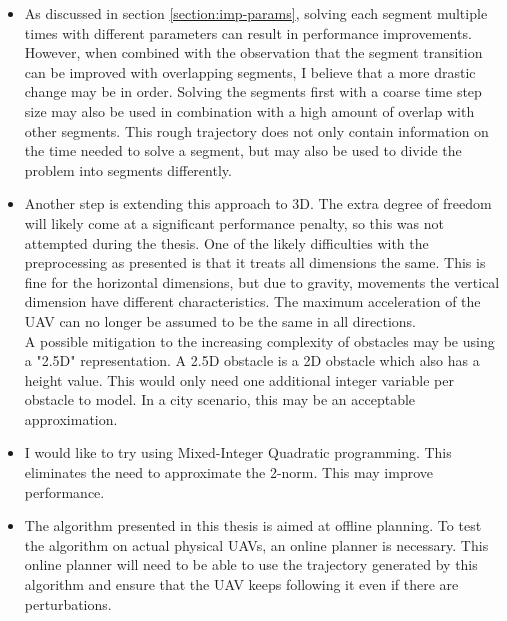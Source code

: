 \begin{itemize}
\item As discussed in section \ref{section:imp-params}, solving each segment multiple times with different parameters can result in performance improvements. However, when combined with the observation that the segment transition can be improved with overlapping segments, I believe that a more drastic change may be in order. Solving the segments first with a coarse time step size may also be used in combination with a high amount of overlap with other segments. This rough trajectory does not only contain information on the time needed to solve a segment, but may also be used to divide the problem into segments differently.
\item Another step is extending this approach to 3D. The extra degree of freedom will likely come at a significant performance penalty, so this was not attempted during the thesis. One of the likely difficulties with the preprocessing as presented is that it treats all dimensions the same. This is fine for the horizontal dimensions, but due to gravity, movements the vertical dimension have different characteristics. The maximum acceleration of the UAV can no longer be assumed to be the same in all directions.\\
A possible mitigation to the increasing complexity of obstacles may be using a "2.5D" representation. A 2.5D obstacle is a 2D obstacle which also has a height value. This would only need one additional integer variable per obstacle to model. In a city scenario, this may be an acceptable approximation.
\item I would like to try using Mixed-Integer Quadratic programming. This eliminates the need to approximate the 2-norm. This may improve performance.
\item The algorithm presented in this thesis is aimed at offline planning. To test the algorithm on actual physical UAVs, an online planner is necessary. This online planner will need to be able to use the trajectory generated by this algorithm and ensure that the UAV keeps following it even if there are perturbations.
\end{itemize}
\newpage
